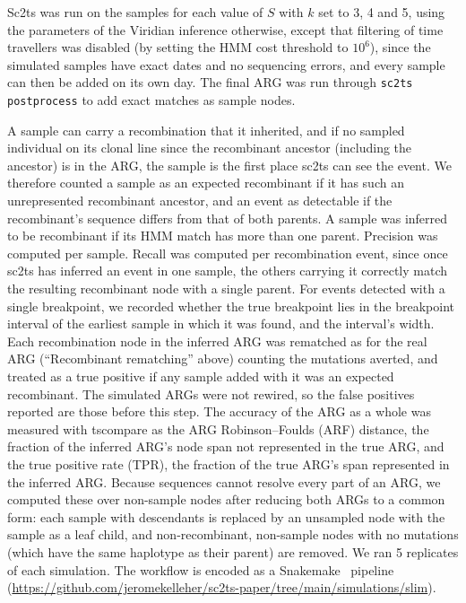 \documentclass[12pt]{article}
\begin{document}
Sc2ts was run on the samples for each value of $S$
with $k$ set to 3, 4 and 5,
using the parameters of the Viridian inference otherwise,
except that filtering of time travellers was disabled
(by setting the HMM cost threshold to $10^6$),
since the simulated samples have exact dates and no sequencing errors,
and every sample can then be added on its own day.
The final ARG was run through \texttt{sc2ts postprocess}
to add exact matches as sample nodes.

A sample can carry a recombination that it inherited,
and if no sampled individual on its clonal line since the recombinant
ancestor (including the ancestor) is in the ARG,
the sample is the first place sc2ts can see the event.
We therefore counted a sample as an expected recombinant
if it has such an unrepresented recombinant ancestor,
and an event as detectable if the recombinant's sequence
differs from that of both parents.
A sample was inferred to be recombinant if its HMM match has more than one parent.
Precision was computed per sample.
Recall was computed per recombination event,
since once sc2ts has inferred an event in one sample,
the others carrying it correctly match the resulting recombinant node
with a single parent.
For events detected with a single breakpoint, we recorded
whether the true breakpoint lies in the breakpoint interval
of the earliest sample in which it was found, and the interval's width.
Each recombination node in the inferred ARG was rematched
as for the real ARG (``Recombinant rematching'' above)
counting the mutations averted,
and treated as a true positive if any sample added with it was an expected recombinant.
The simulated ARGs were not rewired,
so the false positives reported are those before this step.
The accuracy of the ARG as a whole was measured with
tscompare\cite{Fritze2024forest}
as the ARG Robinson--Foulds (ARF) distance,
the fraction of the inferred ARG's node span not represented in the true ARG,
and the true positive rate (TPR),
the fraction of the true ARG's span represented in the inferred ARG.
Because sequences cannot resolve every part of an ARG,
we computed these over non-sample nodes after reducing both ARGs
to a common form: each sample with descendants
is replaced by an unsampled node with the sample as a leaf child,
and non-recombinant, non-sample nodes with no mutations
(which have the same haplotype as their parent) are removed.
We ran 5 replicates of each simulation.
The workflow is encoded as a Snakemake~\cite{Koster2012snakemake} pipeline
(\url{https://github.com/jeromekelleher/sc2ts-paper/tree/main/simulations/slim}).
\end{document}
